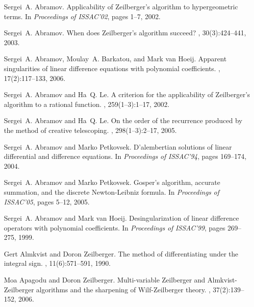 \documentclass{jssc}
\begin{document}
\begin{thebibliography}{199}

Sergei~A. Abramov.
\newblock Applicability of {Z}eilberger's algorithm to hypergeometric terms.
\newblock In {\em Proceedings of ISSAC'02}, pages 1--7, 2002.

Sergei~A. Abramov.
\newblock When does {Z}eilberger's algorithm succeed?
, 30(3):424--441, 2003.

Sergei~A. Abramov, Moulay~A. Barkatou, and Mark van Hoeij.
\newblock Apparent singularities of linear difference equations with polynomial
  coefficients.
,
  17(2):117--133, 2006.

Sergei~A. Abramov and Ha~Q. Le.
\newblock A criterion for the applicability of {Z}eilberger's algorithm to a
  rational function.
, 259(1--3):1--17, 2002.

Sergei~A. Abramov and Ha~Q. Le.
\newblock On the order of the recurrence produced by the method of creative
  telescoping.
, 298(1--3):2--17, 2005.

Sergei~A. Abramov and Marko Petkovsek.
\newblock D'alembertian solutions of linear differential and difference
  equations.
\newblock In {\em Proceedings of ISSAC'94}, pages 169--174, 2004.

Sergei~A. Abramov and Marko Petkovsek.
\newblock Gosper's algorithm, accurate summation, and the discrete
  {N}ewton-{L}eibniz formula.
\newblock In {\em Proceedings of ISSAC'05}, pages 5--12, 2005.

Sergei~A. Abramov and Mark van Hoeij.
\newblock Desingularization of linear difference operators with polynomial
  coefficients.
\newblock In {\em Proceedings of ISSAC'99}, pages 269--275, 1999.

Gert Almkvist and Doron Zeilberger.
\newblock The method of differentiating under the integral sign.
, 11(6):571--591, 1990.

Moa Apagodu and Doron Zeilberger.
\newblock Multi-variable {Z}eilberger and {A}lmkvist-{Z}eilberger algorithms
  and the sharpening of {W}ilf-{Z}eilberger theory.
, 37(2):139--152, 2006.


\end{thebibliography}
\end{document}
